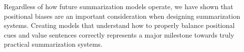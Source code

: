 Regardless of how future summarization models operate, we have shown that positional biases are an important consideration when designing summarization systems. Creating models that understand how to properly balance positional cues and value sentences correctly represents a major milestone towards truly practical summarization systems.
